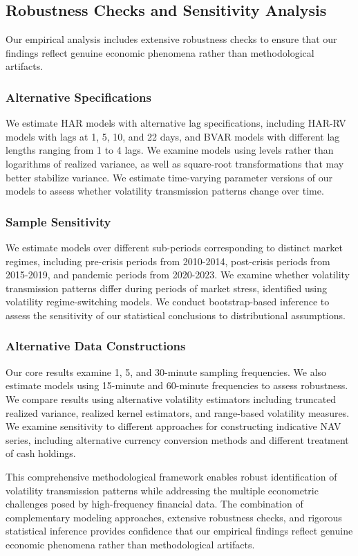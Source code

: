 \subsection{Robustness Checks and Sensitivity Analysis}

Our empirical analysis includes extensive robustness checks to ensure that our findings reflect genuine economic phenomena rather than methodological artifacts.

\subsubsection{Alternative Specifications}

We estimate HAR models with alternative lag specifications, including HAR-RV models with lags at 1, 5, 10, and 22 days, and BVAR models with different lag lengths ranging from 1 to 4 lags. We examine models using levels rather than logarithms of realized variance, as well as square-root transformations that may better stabilize variance. We estimate time-varying parameter versions of our models to assess whether volatility transmission patterns change over time.

\subsubsection{Sample Sensitivity}

We estimate models over different sub-periods corresponding to distinct market regimes, including pre-crisis periods from 2010-2014, post-crisis periods from 2015-2019, and pandemic periods from 2020-2023. We examine whether volatility transmission patterns differ during periods of market stress, identified using volatility regime-switching models. We conduct bootstrap-based inference to assess the sensitivity of our statistical conclusions to distributional assumptions.

\subsubsection{Alternative Data Constructions}

Our core results examine 1, 5, and 30-minute sampling frequencies. We also estimate models using 15-minute and 60-minute frequencies to assess robustness. We compare results using alternative volatility estimators including truncated realized variance, realized kernel estimators, and range-based volatility measures. We examine sensitivity to different approaches for constructing indicative NAV series, including alternative currency conversion methods and different treatment of cash holdings.

This comprehensive methodological framework enables robust identification of volatility transmission patterns while addressing the multiple econometric challenges posed by high-frequency financial data. The combination of complementary modeling approaches, extensive robustness checks, and rigorous statistical inference provides confidence that our empirical findings reflect genuine economic phenomena rather than methodological artifacts.